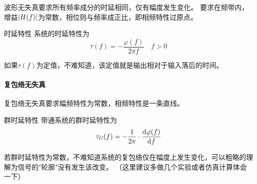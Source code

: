     波形无失真要求所有频率成分的时延相同，仅有幅度发生变化。
    要求在频带内，增益$\left\vert H(f) \right\vert$为常数，相位则与频率成正比，即相频特性过原点。
    \begin{mydef}{时延特性}
        系统的时延特性为
        \begin{equation}
            \tau(f)=-\frac{\varphi(f)}{2\pi f}\hspace{1em}f>0
        \end{equation}
    \end{mydef}
    如果$\tau(f)$为定值，不难知道，该定值就是输出相对于输入落后的时间。

    \paragraph{复包络无失真}\mbox{}

    复包络无失真要求幅频特性为常数，相频特性是一条直线。
    \begin{mydef}{群时延特性}
        带通系统的群时延特性为
        \begin{equation}
            \tau_G(f)=-\frac{1}{2\pi}\cdot\frac{\text{\upshape d}\varphi(f)}{\text{\upshape d} f}
        \end{equation}
    \end{mydef}
    
    若群时延特性为常数，不难知道系统的复包络仅在幅度上发生变化，可以粗略的理解为信号的"轮廓"没有发生该改变。
    （这里建议多做几个实验或者仿真计算体会一下）